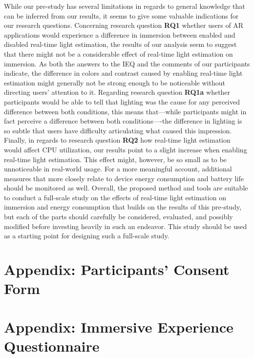 \documentclass[12pt,twoside,english]{article}
\begin{document}
While our pre-study has several limitations in regards to general knowledge that can be inferred from our results, it seems to give some valuable indications for our research questions.
Concerning research question \textbf{RQ1} whether users of \gls{AR} applications would experience a difference in immersion between enabled and disabled real-time light estimation, the results of our analysis seem to suggest that there might not be a considerable effect of real-time light estimation on immersion.
As both the answers to the \gls{IEQ} and the comments of our participants indicate, the difference in colors and contrast caused by enabling real-time light estimation might generally not be strong enough to be noticeable without directing users' attention to it.
Regarding research question \textbf{RQ1a} whether participants would be able to tell that lighting was the cause for any perceived difference between both conditions, this means that---while participants might in fact perceive a difference between both conditions----the difference in lighting is so subtle that users have difficulty articulating what caused this impression.
Finally, in regards to research question \textbf{RQ2} how real-time light estimation would affect \gls{CPU} utilization, our results point to a slight increase when enabling real-time light estimation.
This effect might, however, be so small as to be unnoticeable in real-world usage.
For a more meaningful account, additional measures that more closely relate to device energy consumption and battery life should be monitored as well.
Overall, the proposed method and tools are suitable to conduct a full-scale study on the effects of real-time light estimation on immersion and energy consumption that builds on the results of this pre-study, but each of the parts should carefully be considered, evaluated, and possibly modified before investing heavily in such an endeavor.
This study should be used as a starting point for designing such a full-scale study.



% 


\appendix
\section{Appendix: Participants' Consent Form}
\label{sect:appendix}
\label{sect:consent-form}


\section{Appendix: Immersive Experience Questionnaire}
\label{sect:ieq}


\clearpage
\end{document}
